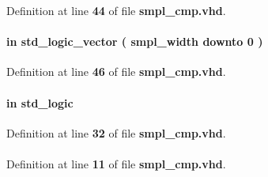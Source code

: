Definition at line {\bf 44} of file {\bf smpl\+\_\+cmp.\+vhd}.

\paragraph[{diq\+\_\+l}]{ {\bfseries \textcolor{keywordflow}{in}\textcolor{vhdlchar}{ }} {\bfseries \textcolor{comment}{std\+\_\+logic\+\_\+vector}\textcolor{vhdlchar}{ }\textcolor{vhdlchar}{(}\textcolor{vhdlchar}{ }\textcolor{vhdlchar}{ }\textcolor{vhdlchar}{ }\textcolor{vhdlchar}{ }{\bfseries {\bf smpl\+\_\+width}} \textcolor{vhdlchar}{ }\textcolor{keywordflow}{downto}\textcolor{vhdlchar}{ }\textcolor{vhdlchar}{ } \textcolor{vhdldigit}{0} \textcolor{vhdlchar}{ }\textcolor{vhdlchar}{)}\textcolor{vhdlchar}{ }} \hspace{0.3cm}{\ttfamily [Port]}}\label{classsmpl__cmp_ab8a556d544fd22f529e240e126146274}


Definition at line {\bf 46} of file {\bf smpl\+\_\+cmp.\+vhd}.

\paragraph[{fidm}]{ {\bfseries \textcolor{keywordflow}{in}\textcolor{vhdlchar}{ }} {\bfseries \textcolor{comment}{std\+\_\+logic}\textcolor{vhdlchar}{ }} \hspace{0.3cm}{\ttfamily [Port]}}\label{classsmpl__cmp_a97ae5ad9eee26d5f984f95d151f62ec0}


Definition at line {\bf 32} of file {\bf smpl\+\_\+cmp.\+vhd}.

\paragraph[{ieee}]{\hspace{0.3cm}{\ttfamily [Library]}}\label{classsmpl__cmp_a0a6af6eef40212dbaf130d57ce711256}


Definition at line {\bf 11} of file {\bf smpl\+\_\+cmp.\+vhd}.

